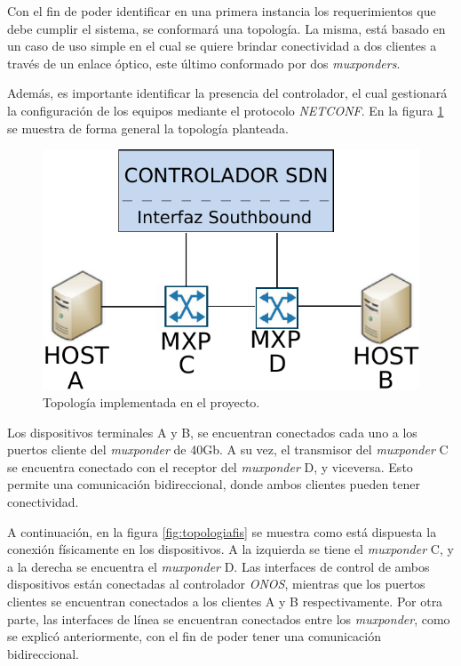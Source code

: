 Con el fin de poder identificar en una primera instancia los requerimientos que debe cumplir el sistema, se conformará una topología. La misma, está basado en un caso de uso simple en el cual se quiere brindar conectividad a dos clientes a través de un enlace óptico, este último conformado por dos \textit{muxponders}.  

Además, es importante identificar la presencia del controlador, el cual gestionará la configuración de los equipos mediante el protocolo \textit{NETCONF}. En la figura \ref{fig:topologia} se muestra de forma general la topología planteada.

\begin{figure}[H]
    \centering
    \includegraphics[scale=0.85]{Figures/topologia.pdf}
    \caption{Topología implementada en el proyecto.}
    \label{fig:topologia}
  \end{figure}


Los dispositivos terminales A y B, se encuentran conectados cada uno a los puertos cliente del \textit{muxponder} de 40Gb. A su vez, el transmisor del \textit{muxponder} C se encuentra conectado con el receptor del \textit{muxponder} D, y viceversa. Esto permite una comunicación bidireccional, donde ambos clientes pueden tener conectividad. 

A continuación, en la figura \ref{fig:topologiafis} se muestra como está dispuesta la conexión físicamente en los dispositivos. A la izquierda se tiene el \textit{muxponder} C, y a la derecha se encuentra el \textit{muxponder} D. Las interfaces de control de ambos dispositivos están conectadas al controlador \textit{ONOS}, mientras que los puertos clientes se encuentran conectados a los clientes A y B respectivamente. Por otra parte, las interfaces de línea se encuentran conectados entre los \textit{muxponder}, como se explicó anteriormente, con el fin de poder tener una comunicación bidireccional.


